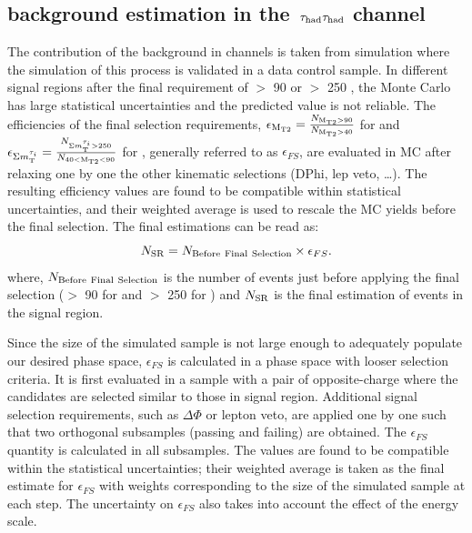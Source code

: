\subsection{\texorpdfstring{\wjets background estimation in the $\,\tau_{\rm had}\tau_{\rm had}$ channel}{W+jets background estimation in the tau-tau channel}}
\label{sect:bkgW}
The contribution of the \wjets background in \tauTau channels is taken from simulation where the simulation of this process is validated in a data control sample. 
In different signal regions after the final requirement of \mttwo $>$ 90 \GeV or \SumMT $>$ 250 \GeV, 
the \wjets Monte Carlo has large statistical uncertainties and the predicted value is not reliable. 
The efficiencies of the final selection requirements, $\epsilon_{\rm M_{T2}}=\frac{N_{\rm M_{T2}>90}}{N_{\rm M_{T2}>40}}$ for  \binone and $\epsilon_{\Sigma m_{\rm T}^{\tau_i}}=\frac{N_{\Sigma m_{\rm T}^{\tau_i}>250}}{N_{40<\rm M_{T2}<90}}$ for \bintwo, generally referred to as $\epsilon_{FS}$, are evaluated in MC after relaxing one by one the other kinematic selections (DPhi, lep veto, …). The resulting efficiency values are found to be compatible within statistical uncertainties, and their weighted average is used to rescale the MC yields before the final selection.
The final estimations can be read as:
\begin{equation}
N_{\rm SR} = N_{\rm Before~Final~Selection} \times \epsilon_{FS}.
\end{equation}
where, $N_{\rm Before~Final~Selection}$ is the number of \wjets events just before applying the final selection 
(\mttwo $>$ 90 \GeV for \binone and \SumMT $>$ 250 \GeV for \bintwo) and $N_{\rm SR}$ is the final estimation of \wjets events in the signal region.

Since the size of the simulated \wjets sample is not large enough to adequately populate our desired phase space, %
$\epsilon_{FS}$ is calculated in a phase space with looser selection criteria. It is first evaluated in a \wjets sample with a pair of opposite-charge \Tau where the \Tau candidates are selected similar to those in signal region. 
Additional signal selection requirements, such as $\Delta \Phi$ or lepton veto, are applied one by one such that two orthogonal subsamples (passing and failing) are obtained. The $\epsilon_{FS}$ quantity is calculated in all subsamples. The values are found to be compatible within the statistical uncertainties; their weighted average is taken as the final estimate for $\epsilon_{FS}$ with weights corresponding to the size of the simulated sample at each step. %
The uncertainty on $\epsilon_{FS}$  also takes into account the effect of the \Tau energy scale.

